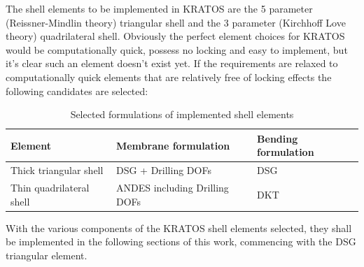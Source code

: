 The shell elements to be implemented in KRATOS are the 5 parameter (Reissner-Mindlin theory) triangular shell and the 3 parameter (Kirchhoff Love theory) quadrilateral shell. Obviously the perfect element choices for KRATOS would be computationally quick, possess no locking and easy to implement, but it's clear such an element doesn't exist yet. If the requirements are relaxed to computationally quick elements that are relatively free of locking effects the following candidates are selected:

\singlespacing
\begin{table}[H]
	\begin{tabularx}{\textwidth}{ | l | X |  X | }
		\hline
		\textbf{Element} 		& 	\textbf{Membrane formulation}	&		\textbf{Bending formulation}	\\
		\hline
		Thick triangular shell
		&
		DSG + Drilling DOFs
		&
		DSG \\
		\hline
		Thin quadrilateral shell
		&
		ANDES including Drilling DOFs
		&
		DKT \\
		\hline
	\end{tabularx}
	\caption{Selected formulations of implemented shell elements}
	\label{table:2}
\end{table}

\doublespacing

With the various components of the KRATOS shell elements selected, they shall be implemented in the following sections of this work, commencing with the DSG triangular element.

